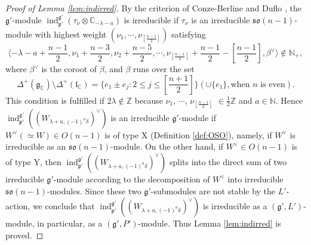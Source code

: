 \begin{proof}
[Proof of Lemma \ref{lem:indirred}]
By the criterion of Conze-Berline and Duflo
 \cite{BeDu}, 
 the ${\mathfrak{g}}'$-module ${\operatorname{ind}}_{\mathfrak{p}'}^{\mathfrak{g}'}
 (\tau_{\nu} \otimes {\mathbb{C}}_{-\lambda-a})
$ 
 is irreducible
 if $\tau_{\nu}$ is an irreducible ${\mathfrak{so}}(n-1)$-module
 with highest weight $(\nu_1, \cdots,\nu_{[\frac{n-1}{2}]})$
 satisfying
\[
\langle
  -\lambda-a+\frac{n-1}{2}, 
   \nu_1+\frac{n-3}{2},
   \nu_2+ \frac{n-5}{2}, 
   \cdots, 
   \nu_{[\frac{n-1}{2}]}+\frac{n-1}{2}- [\frac{n-1}{2}], 
   \beta^{\vee}
\rangle
  \not \in{\mathbb{N}}_+, 
\]
 where $\beta^{\vee}$ is the coroot of $\beta$, 
 and $\beta$ runs over the set 
\[
\Delta^+({\mathfrak{g}}_{\mathbb{C}}) 
 \setminus \Delta^+({\mathfrak{l}}_{\mathbb{C}})
 =\{e_1 \pm e_j : 2 \le j \le [\frac{n+1}{2}]\}
 (\cup \{e_1\}, 
 \text{when $n$ is even}).  
\]
This condition is fulfilled
 if $2 \lambda \not \in {\mathbb{Z}}$
 because $\nu_1$, $\cdots$, $\nu_{[\frac{n-1}{2}]}$
 $\in \frac 1 2 {\mathbb{Z}}$
 and $a \in {\mathbb{N}}$.  
Hence ${\operatorname{ind}}_{\mathfrak{p}'}^{\mathfrak{g}'}
 ((W_{\lambda+a,(-1)^a\delta})^{\vee})
$
 is an irreducible ${\mathfrak{g}}'$-module
 if $W^{\vee}(\simeq W) \in O(n-1)$
 is of type X
 (Definition \ref{def:OSO}), 
 namely,
 if $W^{\vee}$ is irreducible 
 as an ${\mathfrak{so}}(n-1)$-module.  
On the other hand, 
if $W^{\vee} \in O(n-1)$ is of type Y, 
 then ${\operatorname{ind}}_{\mathfrak{p}'}^{\mathfrak{g}'}
 ((W_{\lambda+a,(-1)^a\delta})^{\vee})
$ splits into the direct sum
 of two irreducible ${\mathfrak{g}}'$-module
 according to the decomposition 
 of $W^{\vee}$
 into irreducible ${\mathfrak{so}}(n-1)$-modules.  
Since these two ${\mathfrak{g}}'$-submodules 
 are not stable
 by the $L'$-action,
 we conclude
 that ${\operatorname{ind}}_{\mathfrak{p}'}^{\mathfrak{g}'}
 ((W_{\lambda+a,(-1)^a\delta})^{\vee})
$
 is irreducible as a $({\mathfrak{g}'},L')$-module,
 in particular,
 as a $({\mathfrak{g}'},P')$-module.  
Thus Lemma \ref{lem:indirred} is proved.  
\end{proof}
